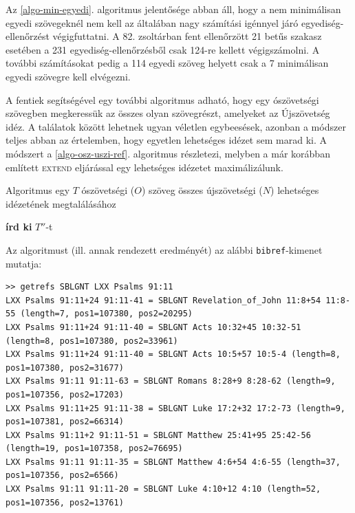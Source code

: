 \documentclass{article}
\begin{document}
Az \ref{algo-min-egyedi}. algoritmus jelentősége abban áll, hogy a nem minimálisan egyedi
szövegeknél nem kell az általában nagy számítási igénnyel járó egyediség-ellenőrzést
végigfuttatni. A 82. zsoltárban fent ellenőrzött 21 betűs szakasz esetében a 231 egyediség-ellenőrzésből
csak 124-re kellett végigszámolni. A további számításokat pedig a 114 egyedi szöveg helyett
csak a 7 minimálisan egyedi szövegre kell elvégezni.

A fentiek segítségével egy további algoritmus adható, hogy egy ószövetségi szövegben megkeressük
az összes olyan szövegrészt, amelyeket az Újszövetség idéz. A találatok között lehetnek
ugyan véletlen egybeesések, azonban a módszer teljes abban az értelemben, hogy egyetlen
lehetséges idézet sem marad ki. A módszert a \ref{algo-osz-uszi-ref}. algoritmus részletezi, melyben a már korábban
említett \textsc{extend} eljárással egy lehetséges idézetet maximálizálunk.

\begin{algorithm}
\caption{Algoritmus egy $T$ ószövetségi ($O$) szöveg összes
újszövetségi ($N$) lehetséges idézetének megtalálásához}
\label{algo-osz-uszi-ref}
\begin{algorithmic}[1]
         \State \textbf{írd ki} {$T''$}-t
        \EndIf
       \EndFor
      \EndFor
    \EndIf
   \EndFor
  \EndFor
 \EndFor
\EndProcedure
\end{algorithmic}
\end{algorithm}

Az algoritmust (ill. annak rendezett eredményét) az alábbi \texttt{bibref}-kimenet mutatja:

\begin{lstlisting}
>> getrefs SBLGNT LXX Psalms 91:11
LXX Psalms 91:11+24 91:11-41 = SBLGNT Revelation_of_John 11:8+54 11:8-55 (length=7, pos1=107380, pos2=20295)
LXX Psalms 91:11+24 91:11-40 = SBLGNT Acts 10:32+45 10:32-51 (length=8, pos1=107380, pos2=33961)
LXX Psalms 91:11+24 91:11-40 = SBLGNT Acts 10:5+57 10:5-4 (length=8, pos1=107380, pos2=31677)
LXX Psalms 91:11 91:11-63 = SBLGNT Romans 8:28+9 8:28-62 (length=9, pos1=107356, pos2=17203)
LXX Psalms 91:11+25 91:11-38 = SBLGNT Luke 17:2+32 17:2-73 (length=9, pos1=107381, pos2=66314)
LXX Psalms 91:11+2 91:11-51 = SBLGNT Matthew 25:41+95 25:42-56 (length=19, pos1=107358, pos2=76695)
LXX Psalms 91:11 91:11-35 = SBLGNT Matthew 4:6+54 4:6-55 (length=37, pos1=107356, pos2=6566)
LXX Psalms 91:11 91:11-20 = SBLGNT Luke 4:10+12 4:10 (length=52, pos1=107356, pos2=13761)
\end{lstlisting}
\end{document}
